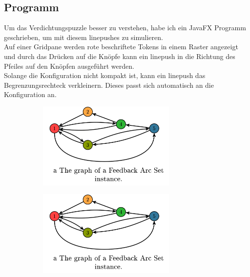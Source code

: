 \documentclass[seminar,german]{algothesis}
\begin{document}
\subsection{Programm}
Um das Verdichtungspuzzle besser zu verstehen, habe ich ein JavaFX Programm geschrieben, um mit diesem linepushes zu simulieren. \\
Auf einer Gridpane werden rote beschriftete Tokens in einem Raster angezeigt und durch das Drücken auf die Knöpfe kann ein linepush in die Richtung des Pfeiles auf den Knöpfen ausgeführt werden.\\
Solange die Konfiguration nicht kompakt ist, kann ein linepush das Begrenzungsrechteck verkleinern. Dieses passt sich automatisch an die Konfiguration an.
\begin{figure}
	\centering
	\begin{subfigure}{.5\textwidth}
		\includegraphics[width=0.75\textwidth]{graph}
    \end{subfigure}%
    \begin{subfigure}{.5\textwidth}
		\includegraphics[width=0.75\textwidth]{graph}
    \end{subfigure}
\end{figure}
\end{document}
